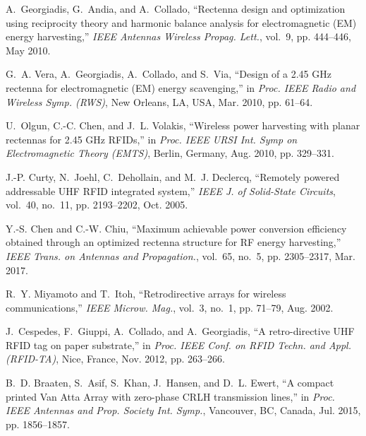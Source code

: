 \documentclass[journal]{IEEEtran}
\begin{document}
\begin{thebibliography}{10}
A.~Georgiadis, G.~Andia, and A.~Collado, ``Rectenna design and optimization
  using reciprocity theory and harmonic balance analysis for electromagnetic
  ({EM}) energy harvesting,'' \emph{{IEEE} Antennas Wireless Propag. Lett.},
  vol.~9, pp. 444--446, May 2010.

G.~A. Vera, A.~Georgiadis, A.~Collado, and S.~Via, ``Design of a 2.45 {GHz}
  rectenna for electromagnetic {(EM)} energy scavenging,'' in \emph{Proc.
  {IEEE} Radio and Wireless Symp. (RWS)}, New Orleans, LA, USA, Mar. 2010, pp.
  61--64.

U.~Olgun, C.-C. Chen, and J.~L. Volakis, ``Wireless power harvesting with
  planar rectennas for 2.45 {GHz} {RFID}s,'' in \emph{Proc. {IEEE} URSI Int.
  Symp on Electromagnetic Theory (EMTS)}, Berlin, Germany, Aug. 2010, pp.
  329--331.

J.-P. Curty, N.~Joehl, C.~Dehollain, and M.~J. Declercq, ``Remotely powered
  addressable {UHF} {RFID} integrated system,'' \emph{{IEEE} J. of Solid-State
  Circuits}, vol.~40, no.~11, pp. 2193--2202, Oct. 2005.

Y.-S. Chen and C.-W. Chiu, ``Maximum achievable power conversion efficiency
  obtained through an optimized rectenna structure for {RF} energy
  harvesting,'' \emph{{IEEE} Trans. on Antennas and Propagation.}, vol.~65,
  no.~5, pp. 2305--2317, Mar. 2017.

R.~Y. Miyamoto and T.~Itoh, ``Retrodirective arrays for wireless
  communications,'' \emph{{IEEE} Microw. Mag.}, vol.~3, no.~1, pp. 71--79, Aug.
  2002.

J.~Cespedes, F.~Giuppi, A.~Collado, and A.~Georgiadis, ``A retro-directive
  {UHF} {RFID} tag on paper substrate,'' in \emph{Proc. {IEEE} Conf. on RFID
  Techn. and Appl. (RFID-TA)}, Nice, France, Nov. 2012, pp. 263--266.

B.~D. Braaten, S.~Asif, S.~Khan, J.~Hansen, and D.~L. Ewert, ``A compact
  printed {V}an {A}tta {A}rray with zero-phase {CRLH} transmission lines,'' in
  \emph{Proc. {IEEE} Antennas and Prop. Society Int. Symp.}, Vancouver, BC,
  Canada, Jul. 2015, pp. 1856--1857.

\end{thebibliography}
\end{document}
